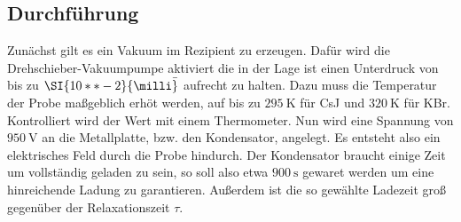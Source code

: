 \subsection{Durchführung}
Zunächst gilt es ein Vakuum im Rezipient zu erzeugen. Dafür wird die Drehschieber-Vakuumpumpe
aktiviert die in der Lage ist einen Unterdruck von bis zu $\SI{10**-2}{\milli\bar}$ aufrecht zu halten.
Dazu muss die Temperatur der Probe maßgeblich erhöt werden, auf bis zu $\SI{295}{\kelvin}$ für 
CsJ und $\SI{320}{\kelvin}$ für KBr. Kontrolliert wird der Wert mit einem Thermometer.
Nun wird eine Spannung von $\SI{950}{\volt}$ an die Metallplatte, bzw. den Kondensator, angelegt. Es entsteht also ein elektrisches 
Feld durch die Probe hindurch. Der Kondensator braucht einige Zeit um vollständig geladen zu sein,
so soll also etwa $\SI{900}{\second}$ gewaret werden um eine hinreichende Ladung zu garantieren.
Außerdem ist die so gewählte Ladezeit groß gegenüber der Relaxationszeit $\tau$.
